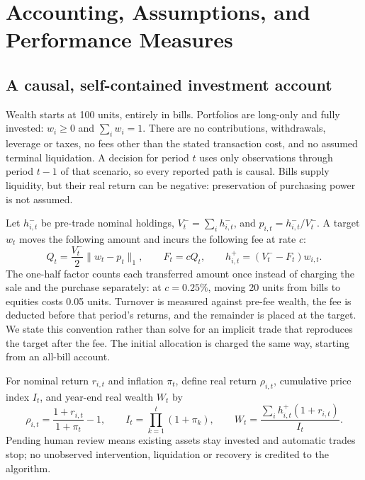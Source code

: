 \section{Accounting, Assumptions, and Performance Measures}
\subsection{A causal, self-contained investment account}
Wealth starts at 100 units, entirely in bills. Portfolios are long-only and fully invested: $w_i\geq0$ and $\sum_i w_i=1$. There are no contributions, withdrawals, leverage or taxes, no fees other than the stated transaction cost, and no assumed terminal liquidation. A decision for period $t$ uses only observations through period $t-1$ of that scenario, so every reported path is causal. Bills supply liquidity, but their real return can be negative: preservation of purchasing power is not assumed.

Let $h^-_{i,t}$ be pre-trade nominal holdings, $V^-_t=\sum_i h^-_{i,t}$, and $p_{i,t}=h^-_{i,t}/V^-_t$. A target $w_t$ moves the following amount and incurs the following fee at rate $c$:
\begin{equation}
Q_t=\frac{V^-_t}{2}\lVert w_t-p_t\rVert_1,\qquad F_t=cQ_t,\qquad
h^+_{i,t}=(V^-_t-F_t)w_{i,t}.
\label{eq:fees}
\end{equation}
The one-half factor counts each transferred amount once instead of charging the sale and the purchase separately: at $c=0.25\%$, moving 20 units from bills to equities costs 0.05 units. Turnover is measured against pre-fee wealth, the fee is deducted before that period's returns, and the remainder is placed at the target. We state this convention rather than solve for an implicit trade that reproduces the target after the fee. The initial allocation is charged the same way, starting from an all-bill account.

For nominal return $r_{i,t}$ and inflation $\pi_t$, define real return $\rho_{i,t}$, cumulative price index $I_t$, and year-end real wealth $W_t$ by
\begin{equation}
\rho_{i,t}=\frac{1+r_{i,t}}{1+\pi_t}-1,\qquad
I_t=\prod_{k=1}^t(1+\pi_k),\qquad
W_t=\frac{\sum_i h^+_{i,t}(1+r_{i,t})}{I_t}.
\end{equation}
Pending human review means existing assets stay invested and automatic trades stop; no unobserved intervention, liquidation or recovery is credited to the algorithm.

